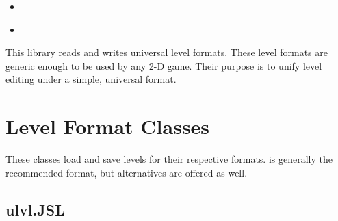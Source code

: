 \documentclass[letterpaper,10pt,english]{sphinxmanual}
\begin{document}
\begin{sphinxShadowBox}
\begin{itemize}
\begin{itemize}
\begin{itemize}
\begin{itemize}
\end{itemize}

\end{itemize}

\item {} 
\label{\detokenize{index:id11}}{\hyperref[\detokenize{index:helper-classes}]{}}

\item {} 
\label{\detokenize{index:id12}}{\hyperref[\detokenize{index:indices-and-tables}]{}}

\end{itemize}

\end{itemize}
\end{sphinxShadowBox}
\label{\detokenize{index:module-ulvl}}
This library reads and writes universal level formats.  These level
formats are generic enough to be used by any 2-D game.  Their purpose is
to unify level editing under a simple, universal format.


\chapter{Level Format Classes}
\label{\detokenize{index:level-format-classes}}
These classes load and save levels for their respective formats.
{\hyperref[\detokenize{index:ulvl.JSL}]{}} is generally the recommended format, but alternatives
are offered as well.


\section{ulvl.JSL}
\label{\detokenize{index:ulvl-jsl}}
\end{document}
